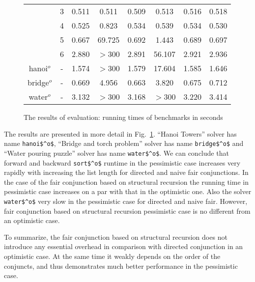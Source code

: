 \begin{figure}[h!]
\begin{tabular}{ c | c | c | c | c | c | c | c }
                 & 3    & 0.511 &  0.511 & 0.509 & 0.513  & 0.516 & 0.518 \\
                 & 4    & 0.525 &  0.823 & 0.534 & 0.539  & 0.534 & 0.530 \\
                 & 5    & 0.667 & 69.725 & 0.692 & 1.443  & 0.689 & 0.697 \\
                 & 6    & 2.880 & $>$300 & 2.891 & 56.107 & 2.921 & 2.936 \\
    \hline
    hanoi$^o$    & -    & 1.574 & $>$300 & 1.579 & 17.604 & 1.585 & 1.646 \\
    \hline
    bridge$^o$   & -    & 0.669 & 4.956  & 0.663 & 3.820  & 0.675 & 0.712 \\
    \hline
    water$^o$    & -    & 3.132 & $>$300 & 3.168 & $>$300 & 3.220 & 3.414

  \end{tabular}
  \caption{The results of evaluation: running times of benchmarks in seconds}
  \label{fair:evaluation-table}
\end{figure}

The results are presented in more detail in Fig.~\ref{fair:evaluation-table}. ``Hanoi Towers'' solver has name \lstinline{hanoi$^o$}, ``Bridge and torch problem'' solver has name \lstinline{bridge$^o$} and ``Water pouring puzzle'' solver has name \lstinline{water$^o$}. We can conclude that forward and backward \lstinline{sort$^o$} runtime in the pessimistic case increases very rapidly with increasing the list length for directed and naive fair conjunctions. In the case of the fair conjunction based on structural recursion the running time in pessimistic case increases on a par with that in the optimistic one. Also  the solver \lstinline{water$^o$} very slow in the pessimistic case for directed and naive fair. However, fair conjunction based on structural recursion pessimistic case is no different from an optimistic case.


To summarize, the fair conjunction based on structural recursion does not introduce any essential overhead in comparison with directed conjunction in an optimistic case. At the same time it
weakly depends on the order of the conjuncts, and thus demonstrates much better performance in the pessimistic case.